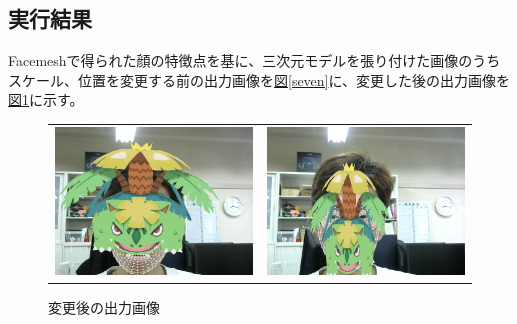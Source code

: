 \documentclass[]{jarticle}          %
\begin{document}
\subsection{実行結果}
Facemeshで得られた顔の特徴点を基に、三次元モデルを張り付けた画像のうち
スケール、位置を変更する前の出力画像を\hyperref[seven]{図\ref{seven}}に、変更した後の出力画像を\hyperref[eight]{図\ref{eight}}に示す。\\
\begin{figure}[!ht]
  \begin{tabular}{cc}
    \begin{minipage}[t]{0.45\hsize}
      \centering
      \includegraphics[keepaspectratio, scale=0.3]{figures/output1.png}
      \caption{変更前の出力画像}
      \label{seven}
    \end{minipage} &
    \begin{minipage}[t]{0.45\hsize}
      \centering
      \includegraphics[keepaspectratio, scale=0.3]{figures/output2.png}
      \caption{変更後の出力画像}
      \label{eight}
    \end{minipage}
  \end{tabular}
\end{figure}
\end{document}
